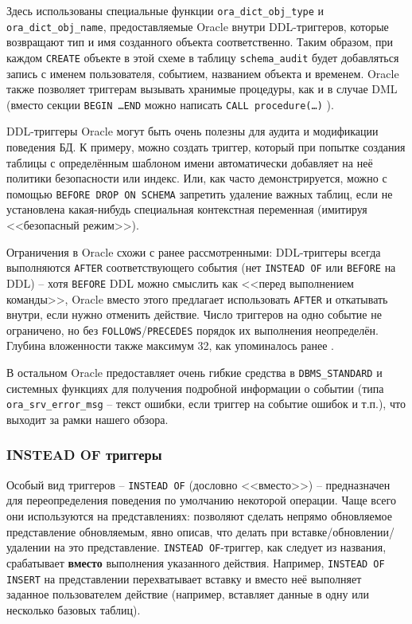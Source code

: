 Здесь использованы специальные функции \texttt{ora\_dict\_obj\_type} и \texttt{ora\_dict\_obj\_name}, предоставляемые Oracle внутри DDL-триггеров, которые возвращают тип и имя созданного объекта соответственно. Таким образом, при каждом \texttt{CREATE} объекте в этой схеме в таблицу \texttt{schema\_audit} будет добавляться запись с именем пользователя, событием, названием объекта и временем. Oracle также позволяет триггерам вызывать хранимые процедуры, как и в случае DML (вместо секции \texttt{BEGIN \ldots END} можно написать \texttt{CALL procedure(\ldots)} \autocite{oracledbdoc7}).

DDL-триггеры Oracle могут быть очень полезны для аудита и модификации поведения БД. К примеру, можно создать триггер, который при попытке создания таблицы с определённым шаблоном имени автоматически добавляет на неё политики безопасности или индекс. Или, как часто демонстрируется, можно с помощью \texttt{BEFORE DROP ON SCHEMA} запретить удаление важных таблиц, если не установлена какая-нибудь специальная контекстная переменная (имитируя <<безопасный режим>>).

Ограничения в Oracle схожи с ранее рассмотренными: DDL-триггеры всегда выполняются \texttt{AFTER} соответствующего события (нет \texttt{INSTEAD OF} или \texttt{BEFORE} на DDL) – хотя \texttt{BEFORE} DDL можно смыслить как <<перед выполнением команды>>, Oracle вместо этого предлагает использовать \texttt{AFTER} и откатывать внутри, если нужно отменить действие. Число триггеров на одно событие не ограничено, но без \texttt{FOLLOWS}/\texttt{PRECEDES} порядок их выполнения неопределён. Глубина вложенности также максимум 32, как упоминалось ранее \autocite{oracledbdoc8}. 

В остальном Oracle предоставляет очень гибкие средства в \texttt{DBMS\_STANDARD} и системных функциях для получения подробной информации о событии (типа \texttt{ora\_srv\_error\_msg} – текст ошибки, если триггер на событие ошибок и т.п.), что выходит за рамки нашего обзора.

\subsubsection{INSTEAD OF триггеры}

Особый вид триггеров – \texttt{INSTEAD OF} (дословно <<вместо>>) – предназначен для переопределения поведения по умолчанию некоторой операции. Чаще всего они используются на представлениях: позволяют сделать непрямо обновляемое представление обновляемым, явно описав, что делать при вставке/обновлении/удалении на это представление. \texttt{INSTEAD OF}-триггер, как следует из названия, срабатывает \textbf{вместо} выполнения указанного действия.
Например, \texttt{INSTEAD OF INSERT} на представлении перехватывает вставку и вместо неё выполняет заданное пользователем действие (например, вставляет данные в одну или несколько базовых таблиц).

